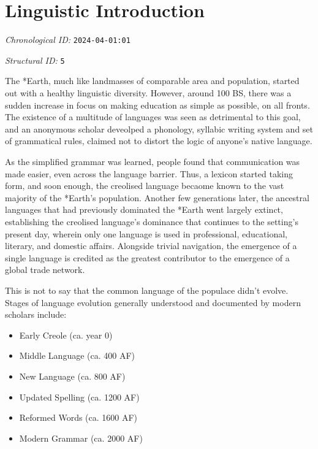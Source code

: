 \section{Linguistic Introduction}
\emph{Chronological ID:} \texttt{2024-04-01:01}

\emph{Structural ID:} \texttt{5}

The *Earth, much like landmasses of comparable area and population, started out with a healthy linguistic diversity. However, around 100 BS, there was a sudden increase in focus on making education as simple as possible, on all fronts. The existence of a multitude of languages was seen as detrimental to this goal, and an anonymous scholar deveolped a phonology, syllabic writing system and set of grammatical rules, claimed not to distort the logic of anyone's native language.

As the simplified grammar was learned, people found that communication was made easier, even across the language barrier. Thus, a lexicon started taking form, and soon enough, the creolised language becaome known to the vast majority of the *Earth's population. Another few generations later, the ancestral languages that had previously dominated the *Earth went largely extinct, establishing the creolised language's dominance that continues to the setting's present day, wherein only one language is used in professional, educational, literary, and domestic affairs. Alongside trivial navigation, the emergence of a single language is credited as the greatest contributor to the emergence of a global trade network.

This is not to say that the common language of the populace didn't evolve. Stages of language evolution generally understood and documented by modern scholars include:

\begin{itemize}
  \item Early Creole (ca. year 0)
  \item Middle Language (ca. 400 AF)
  \item New Language (ca. 800 AF)
  \item Updated Spelling (ca. 1200 AF)
  \item Reformed Words (ca. 1600 AF)
  \item Modern Grammar (ca. 2000 AF)
\end{itemize}
\newpage
